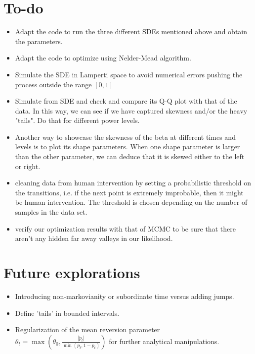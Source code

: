 \documentclass[a4paper, 12pt]{article}
\begin{document}
\section{To-do}
\begin{itemize}
	\item Adapt the code to run the three different SDEs mentioned above and obtain the parameters.
	\item Adapt the code to optimize using Nelder-Mead algorithm.
	\item Simulate the SDE in Lamperti space to avoid numerical errors pushing the process outside the range $[0,1]$
	\item Simulate from SDE and check and compare its Q-Q plot with that of the data. In this way, we can see if we have captured skewness and/or the heavy "tails". Do that for different power levels.
	\item Another way to showcase the skewness of the beta at different times and levels is to plot its shape parameters. When one shape parameter is larger than the other parameter, we can deduce that it is skewed either to the left or right.
	\item cleaning data from human intervention by setting a probabilistic threshold on the transitions, i.e. if the next point is extremely improbable, then it might be human intervention. The threshold is chosen depending on the number of samples in the data set.
	\item verify our optimization results with that of MCMC to be sure that there aren't any hidden far away valleys in our likelihood.
\end{itemize}
\section{Future explorations}

\begin{itemize}
	\item Introducing non-markovianity or subordinate time versus adding jumps.
	\item Define 'tails' in bounded intervals.
	\item Regularization of the mean reversion parameter $\theta_t = \max \left(  \theta_0, \frac{|\dot{p}_t|}{\min(p_t,1-p_t)} \right)$  for further analytical manipulations.
\end{itemize}
\end{document}
